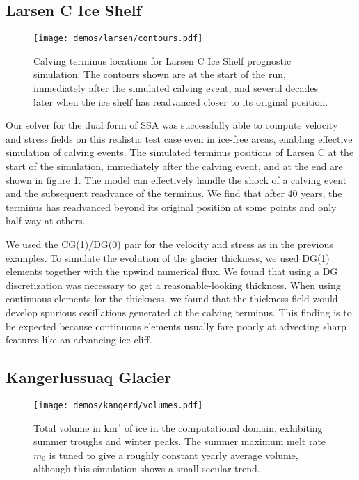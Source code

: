 \documentclass[review,oneside]{igs}
\begin{document}
\subsection{Larsen C Ice Shelf}

\begin{figure}[h]
    \begin{center}
        \texttt{[image: demos/larsen/contours.pdf]}
    \end{center}
    \caption{Calving terminus locations for Larsen C Ice Shelf prognostic simulation.
    The contours shown are at the start of the run, immediately after the simulated calving event, and several decades later when the ice shelf has readvanced closer to its original position.}
    \label{fig:larsen-terminus-position}
\end{figure}

Our solver for the dual form of SSA was successfully able to compute velocity and stress fields on this realistic test case even in ice-free areas, enabling effective simulation of calving events.
The simulated terminus positions of Larsen C at the start of the simulation, immediately after the calving event, and at the end are shown in figure \ref{fig:larsen-terminus-position}.
The model can effectively handle the shock of a calving event and the subsequent readvance of the terminus.
We find that after 40 years, the terminus has readvanced beyond its original position at some points and only half-way at others.

We used the CG(1)/DG(0) pair for the velocity and stress as in the previous examples.
To simulate the evolution of the glacier thickness, we used DG(1) elements together with the upwind numerical flux.
We found that using a DG discretization was necessary to get a reasonable-looking thickness.
When using continuous elements for the thickness, we found that the thickness field would develop spurious oscillations generated at the calving terminus.
This finding is to be expected because continuous elements usually fare poorly at advecting sharp features like an advancing ice cliff.


\subsection{Kangerlussuaq Glacier}

\begin{figure}[h]
    \begin{center}
        \texttt{[image: demos/kangerd/volumes.pdf]}
    \end{center}
    \caption{Total volume in km${}^3$ of ice in the computational domain, exhibiting summer troughs and winter peaks.
    The summer maximum melt rate $m_0$ is tuned to give a roughly constant yearly average volume, although this simulation shows a small secular trend.}
    \label{fig:kangerd-volumes}
\end{figure}
\end{document}

